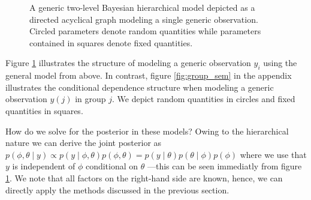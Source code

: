 \begin{figure}[!ht]
\begin{center}
\end{center}
\caption{A generic two-level Bayesian hierarchical model depicted as a directed acyclical graph modeling a single generic observation. Circled parameters denote random quantities while parameters contained in squares denote fixed quantities.}
\label{fig:general_sem}
\end{figure}

Figure \ref{fig:general_sem} illustrates the structure of modeling a generic observation $y_i$ using the general model from above.
In contrast, figure \ref{fig:group_sem} in the appendix illustrates the conditional dependence structure when modeling a generic observation $y(j)$ in group $j$.
We depict random quantities in circles and fixed quantities in squares.

How do we solve for the posterior in these models?
Owing to the hierarchical nature we can derive the joint posterior as $p(\phi, \theta \mid y) \propto p(y \mid \phi, \theta) p(\phi, \theta) = p(y \mid \theta) p(\theta \mid \phi) p(\phi)$ where we use that $y$ is independent of $\phi$ conditional on $\theta$ ---this can be seen immediatly from figure \ref{fig:general_sem}.
We note that all factors on the right-hand side are known, hence, we can directly apply the methods discussed in the previous section.



